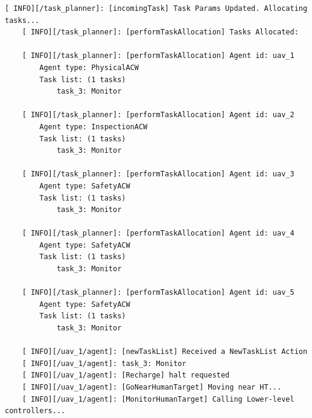 \begin{lstlisting}[caption={Feedback messages printed after changing the parameters of a task}, breaklines=true, label=exit:paramChange]
    [ INFO][/task_planner]: [incomingTask] Task Params Updated. Allocating tasks...
    [ INFO][/task_planner]: [performTaskAllocation] Tasks Allocated:
    
    [ INFO][/task_planner]: [performTaskAllocation] Agent id: uav_1
        Agent type: PhysicalACW
        Task list: (1 tasks)
            task_3: Monitor
    
    [ INFO][/task_planner]: [performTaskAllocation] Agent id: uav_2
        Agent type: InspectionACW
        Task list: (1 tasks)
            task_3: Monitor
    
    [ INFO][/task_planner]: [performTaskAllocation] Agent id: uav_3
        Agent type: SafetyACW
        Task list: (1 tasks)
            task_3: Monitor
    
    [ INFO][/task_planner]: [performTaskAllocation] Agent id: uav_4
        Agent type: SafetyACW
        Task list: (1 tasks)
            task_3: Monitor
    
    [ INFO][/task_planner]: [performTaskAllocation] Agent id: uav_5
        Agent type: SafetyACW
        Task list: (1 tasks)
            task_3: Monitor
    
    [ INFO][/uav_1/agent]: [newTaskList] Received a NewTaskList Action
    [ INFO][/uav_1/agent]: task_3: Monitor
    [ INFO][/uav_1/agent]: [Recharge] halt requested
    [ INFO][/uav_1/agent]: [GoNearHumanTarget] Moving near HT...
    [ INFO][/uav_1/agent]: [MonitorHumanTarget] Calling Lower-level controllers...
\end{lstlisting}

